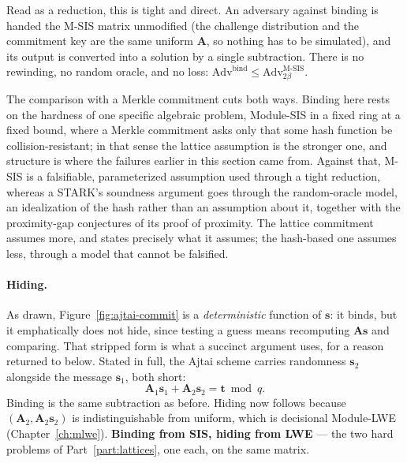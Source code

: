 Read as a reduction, this is tight and direct. An adversary against binding is
handed the M-SIS matrix unmodified (the challenge distribution and the
commitment key are the same uniform $\mathbf{A}$, so nothing has to be
simulated), and its output is converted into a solution by a single
subtraction. There
is no rewinding, no random oracle, and no loss:
$\mathrm{Adv}^{\mathrm{bind}} \le \mathrm{Adv}^{\text{M-SIS}}_{2\beta}$.

The comparison with a Merkle commitment cuts both ways. Binding here rests on
the hardness of one specific algebraic problem, Module-SIS in a fixed ring at a
fixed bound, where a Merkle commitment asks only that some hash function be
collision-resistant; in that sense the lattice assumption is the stronger one,
and structure is where the failures earlier in this section came from. Against
that, M-SIS is a falsifiable, parameterized assumption used through a tight
reduction, whereas a STARK's soundness argument goes through the random-oracle
model, an idealization of the hash rather than an assumption about it, together
with the proximity-gap conjectures of its proof of proximity. The lattice
commitment assumes more, and states precisely what it assumes; the hash-based
one assumes less, through a model that cannot be falsified.

\paragraph{Hiding.}
As drawn, Figure~\ref{fig:ajtai-commit} is a \emph{deterministic} function of
$\mathbf{s}$: it binds, but it emphatically does not hide, since testing a guess
means recomputing $\mathbf{A}\mathbf{s}$ and comparing. That stripped form is
what a succinct argument uses, for a reason returned to below. Stated in full,
the Ajtai scheme carries randomness $\mathbf{s}_2$ alongside the message
$\mathbf{s}_1$, both short:
\[
  \mathbf{A}_1\mathbf{s}_1 + \mathbf{A}_2\mathbf{s}_2 = \mathbf{t} \bmod q .
\]
Binding is the same subtraction as before. Hiding now follows because
$(\mathbf{A}_2,\mathbf{A}_2\mathbf{s}_2)$ is indistinguishable from uniform,
which is decisional Module-LWE (Chapter~\ref{ch:mlwe}). \textbf{Binding from
SIS, hiding from LWE} --- the two hard problems of Part~\ref{part:lattices}, one
each, on the same matrix.

